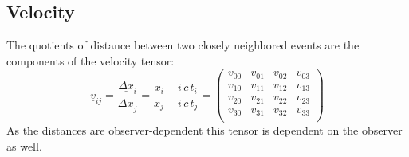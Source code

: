 \documentclass[]{article}
\begin{document}
\subsection{Velocity}
The quotients of distance between two closely neighbored events are the components of the velocity tensor:
\begin{equation}
	\underline{v}_{ij}
	=
	\frac{\underline{\Delta x}_i}{\underline{\Delta x}_j}
	=
	\frac{x_i + i\, c\, t_i}{x_j + i\, c\, t_j}
	=
	\begin{pmatrix}
	v_{00} & v_{01} & v_{02} & v_{03}\\
	v_{10} & v_{11} & v_{12} & v_{13}\\
	v_{20} & v_{21} & v_{22} & v_{23}\\
	v_{30} & v_{31} & v_{32} & v_{33}\\
	\end{pmatrix}
\end{equation}
As the distances are observer-dependent this tensor is dependent on the observer as well.
\end{document}
